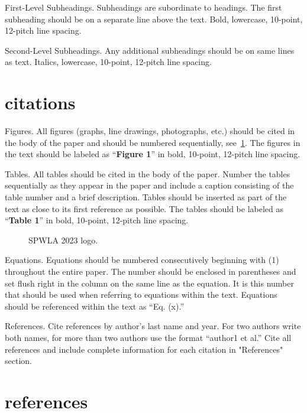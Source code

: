 \documentclass[10pt,twocolumn,twoside]{article}
\begin{document}
First-Level Subheadings. Subheadings are subordinate to headings. The first subheading should be on a separate line above the text. Bold, lowercase, 10-point, 12-pitch line spacing.

Second-Level Subheadings. Any additional subheadings should be on same lines as text. Italics, lowercase, 10-point, 12-pitch line spacing.

\section{citations}

Figures. All figures (graphs, line drawings, photographs, etc.) should be cited in the body of the paper and should be numbered sequentially, see~\cref{fig:logo}. The figures in the text should be labeled as “\textbf{Figure 1}” in bold, 10-point, 12-pitch line spacing.

Tables. All tables should be cited in the body of the paper. Number the tables sequentially as they appear in the paper and include a caption consisting of the table number and a brief description. Tables should be inserted as part of the text as close to its first reference as possible. The tables should be labeled as “\textbf{Table 1}” in bold, 10-point, 12-pitch line spacing.

\begin{figure}
	\centering
	\caption{SPWLA 2023 logo.}
	\label{fig:logo}
\end{figure}


Equations. Equations should be numbered consecutively beginning with (1) throughout the entire paper. The number should be enclosed in parentheses and set flush right in the column on the same line as the equation. It is this number that should be used when referring to equations within the text. Equations should be referenced within the text as “Eq. (x).”

References. Cite references by author’s last name and year. For two authors write both names, for more than two authors use the format “author1 et al.” Cite all references and include complete information for each citation in "References" section.

\section{references}
\end{document}
